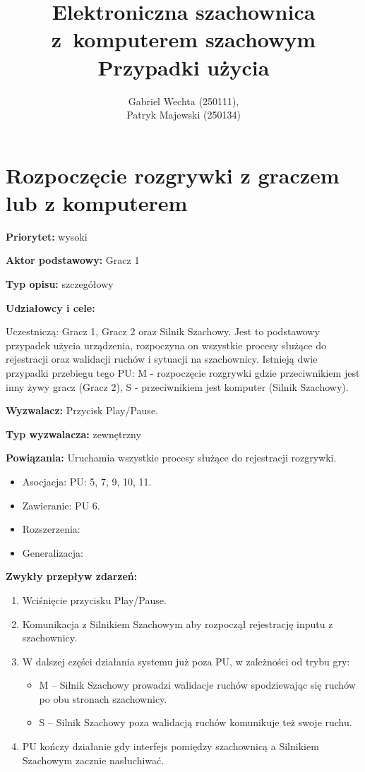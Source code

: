 \documentclass[12pt]{article}
\title{%
Elektroniczna szachownica z komputerem szachowym \\
\large Przypadki użycia
}
\author{Gabriel Wechta (250111),\\ Patryk Majewski (250134) }
\date{}
\begin{document}
\maketitle

\section{Rozpoczęcie rozgrywki z graczem lub z komputerem}
\textbf{Priorytet:} wysoki

\textbf{Aktor podstawowy:} Gracz 1

\textbf{Typ opisu:} szczegółowy

\textbf{Udziałowcy i cele:} 

Uczestniczą: Gracz 1, Gracz 2 oraz Silnik Szachowy. Jest to podstawowy przypadek użycia urządzenia, rozpoczyna on wszystkie procesy służące do rejestracji oraz walidacji ruchów i sytuacji na szachownicy. Istnieją dwie przypadki przebiegu tego PU: M - rozpoczęcie rozgrywki gdzie przeciwnikiem jest inny żywy gracz (Gracz 2), S - przeciwnikiem jest komputer (Silnik Szachowy).

\textbf{Wyzwalacz:} Przycisk Play/Pause.

\textbf{Typ wyzwalacza:} zewnętrzny

\textbf{Powiązania:} Uruchamia wszystkie procesy służące do rejestracji rozgrywki. 
\begin{itemize}
	\item Asocjacja: PU: 5, 7, 9, 10, 11.
	\item Zawieranie: PU 6.
	\item Rozszerzenia: 
	\item Generalizacja:
\end{itemize} 

\textbf{Zwykły przepływ zdarzeń:}  
\begin{enumerate}
\item Wciśnięcie przycisku Play/Pause.
\item Komunikacja z Silnikiem Szachowym aby rozpoczął rejestrację inputu z szachownicy.
\item W dalszej części działania systemu już poza PU, w zależności od trybu gry:
\begin{itemize}
    \item M -- Silnik Szachowy prowadzi walidacje ruchów spodziewając się ruchów po obu stronach szachownicy.
    \item S -- Silnik Szachowy poza walidacją ruchów komunikuje też swoje ruchu.
\end{itemize}
\item PU kończy działanie gdy interfejs pomiędzy szachownicą a Silnikiem Szachowym zacznie nasłuchiwać. 
\end{enumerate}
\end{document}
